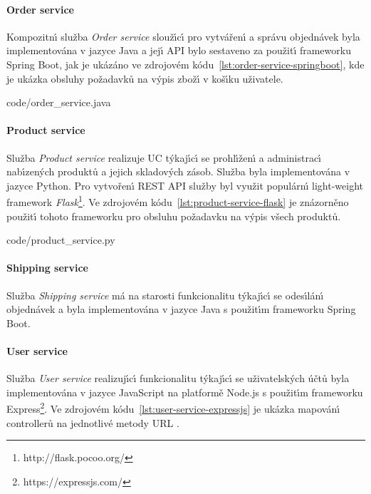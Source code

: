 \paragraph{Order service}

Kompozitn\'{\i} služba \textit{Order service} slouž\'{\i}c\'{\i} pro vytvářen\'{\i} a správu objednávek
byla implementována v jazyce Java a jej\'{\i} \gls{API} bylo sestaveno za použit\'{\i} frameworku Spring
Boot, jak je ukázáno ve zdrojovém kódu~\ref{lst:order-service-springboot}, kde
je ukázka obsluhy požadavků na v\'ypis zbož\'{\i} v koš\'{\i}ku uživatele.


{code/order_service.java}

\paragraph{Product service}

Služba \textit{Product service} realizuje \gls{UC} t\'ykaj\'{\i}c\'{\i} se
prohl\'{\i}žen\'{\i} a administrac\'{\i} nab\'{\i}zen\'ych
produktů a jejich skladov\'ych zásob. Služba byla implementována v jazyce Python.
Pro vytvořen\'{\i} \gls{REST} \gls{API} služby byl využit populárn\'{\i}
light-weight framework \textit{Flask}\footnote{http://flask.pocoo.org/}.
Ve zdrojovém kódu~\ref{lst:product-service-flask} je znázorněno použit\'{\i}
tohoto frameworku pro obsluhu požadavku na v\'ypis všech produktů.


{code/product_service.py}

\paragraph{Shipping service}

Služba \textit{Shipping service} má na starosti funkcionalitu t\'ykaj\'{\i}c\'{\i} se odes\'{\i}lán\'{\i} objednávek
a byla implementována v jazyce Java s použit\'{\i}m frameworku Spring Boot.

\paragraph{User service}

Služba \textit{User service} realizuj\'{\i}c\'{\i} funkcionalitu t\'ykaj\'{\i}c\'{\i} se uživatelsk\'ych účtů byla
implementována v jazyce JavaScript na platformě Node.js s použit\'{\i}m
frameworku Express\footnote{https://expressjs.com/}. Ve zdrojovém kódu~\ref{lst:user-service-expressjs}
je ukázka mapován\'{\i} controllerů na jednotlivé metody \gls{URL} .

